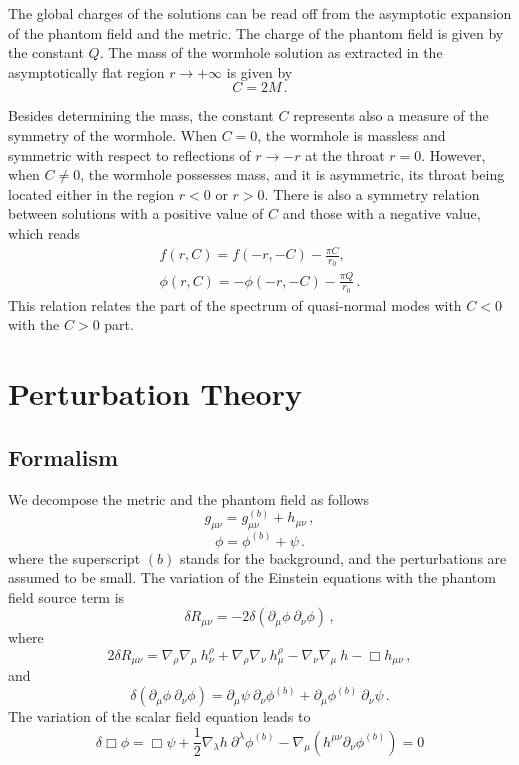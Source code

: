 \documentclass[a4paper,12pt]{article}
\newcommand{\be}{\begin{equation}}
\newcommand{\ee}{\end{equation}}
\begin{document}
The global charges of the solutions can be read off from the asymptotic expansion of the phantom field and the metric.
The charge of the phantom field is given by the constant $Q$. 
The mass of the wormhole solution as extracted in the asymptotically flat region $r \to +\infty$ is given by
\begin{equation}
 C =  2 M \,.
%
\end{equation}
%

Besides determining the mass, the constant $C$ represents also a measure of the symmetry of the wormhole. 
When $C=0$, the wormhole is massless and symmetric with respect to reflections of $r \to -r$ at the throat $r=0$.
However, when $C \neq 0$, 
the wormhole possesses mass, and it is asymmetric, its throat being located either in the region $r<0$ or $r>0$.
%
There is also a symmetry relation between solutions with a positive value of $C$ and those with a negative value, which reads
\begin{eqnarray}
f(r,C) = f(-r,-C) - \frac{\pi C}{r_0}, \nonumber \\
\phi(r,C) = -\phi(-r,-C) - \frac{\pi Q}{r_0} \,.
\end{eqnarray}
%
This relation relates the part of the spectrum of 
quasi-normal modes with $C<0$ with the $C>0$ part.


\section{Perturbation Theory}

   \subsection{Formalism}

We decompose the metric and the phantom field as follows
   \be
   g_{\mu\nu}=g^{(b)}_{\mu\nu}+h_{\mu\nu} \,,
   \ee
    \be
    \phi=\phi^{(b)}+\psi \,.
    \ee
where the superscript ${(b)}$ stands for the background, 
and the perturbations are assumed to be small.
The variation of the Einstein equations with the phantom field source term is
   \be
   \delta R_{\mu\nu}= -2 \delta(\partial_\mu\phi\ \partial_\nu\phi) \,,
   \label{Estn}
   \ee
   where
 \be
  2 \delta R_{\mu\nu}=\nabla_\rho\nabla_\mu\ h^{\rho}_\nu+\nabla_\rho\nabla_\nu\ h^{\rho}_\mu-\nabla_\nu\nabla_\mu\ h-\Box h_{\mu\nu} \,,
 \ee
 and
   \be
   \delta(\partial_\mu\phi\ \partial_\nu\phi)=\partial_\mu\psi\ \partial_\nu\phi^{(b)}+\partial_\mu\phi^{(b)}\ \partial_\nu\psi \,.
   \ee
The variation of the scalar field equation leads to
    \be
    \delta\Box\phi=\Box\psi+\frac{1}{2}\nabla_\lambda h\ \partial^{\lambda}\phi^{(b)}-\nabla_\mu\left(h^{\mu\nu}\partial_\nu\phi^{(b)}\right)=0
    \label{box-phantom}
    \ee 
\end{document}
